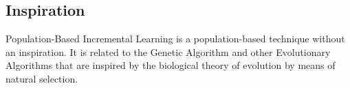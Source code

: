 \subsection{Inspiration}
Population-Based Incremental Learning is a population-based technique without an inspiration. It is related to the Genetic Algorithm and other Evolutionary Algorithms that are inspired by the biological theory of evolution by means of natural selection.



